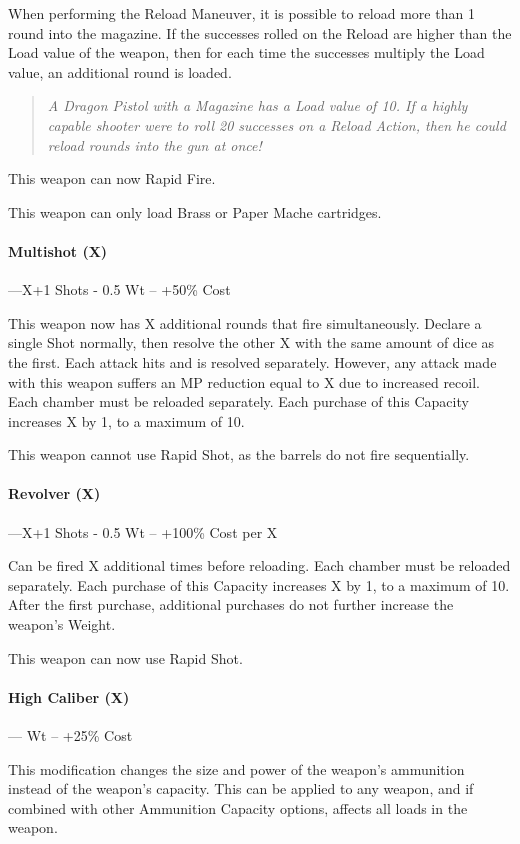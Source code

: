 \documentclass[oneside,11pt,english]{book}
\begin{document}
When performing the Reload Maneuver, it is possible to reload more than 1 round into the magazine. If the successes rolled on the Reload are higher than the Load value of the weapon, then for each time the successes multiply the Load value, an additional round is loaded.
	\begin{quote}
		\emph{A Dragon Pistol with a Magazine has a Load value of 10. If a highly capable shooter were to roll 20 successes on a Reload Action, then he could reload rounds into the gun at once!}
	\end{quote}

This weapon can now Rapid Fire.

This weapon can only load Brass or Paper Mache cartridges.

\paragraph{Multishot (X)}---\quad X+1 Shots - 0.5 Wt -- +50\% Cost

This weapon now has X additional rounds that fire simultaneously. Declare a single Shot normally, then resolve the other X with the same amount of dice as the first.
Each attack hits and is resolved separately. However, any attack made with this weapon suffers an MP reduction equal to X due to increased recoil. Each chamber must be reloaded separately. Each purchase of this Capacity increases X by 1, to a maximum of 10.

This weapon cannot use Rapid Shot, as the barrels do not fire sequentially.

\paragraph{Revolver (X)}---\quad X+1 Shots - 0.5 Wt -- +100\% Cost per X

Can be fired X additional times before reloading. Each chamber must be reloaded separately. Each purchase of this Capacity increases X by 1, to a maximum of 10. 
After the first purchase, additional purchases do not further increase the weapon’s Weight. 

This weapon can now use Rapid Shot. 

\paragraph{High Caliber (X)}--- Wt -- +25\% Cost

This modification changes the size and power of the weapon’s ammunition instead of the weapon’s capacity. This can be applied to any weapon, and if combined with other Ammunition Capacity options, affects all loads in the weapon.
\end{document}
